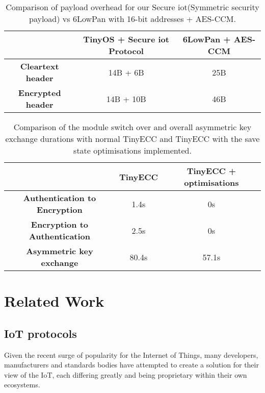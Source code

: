 \documentclass[conference]{./sty/IEEEtran}
\begin{document}
\begin{table}[h] %
  \begin{center} 
  \begin{tabular}{|c|c|c|} 
  \hline
                            & \textbf{TinyOS + Secure iot Protocol} & \textbf{6LowPan + AES-CCM} \\ \hline
  \textbf{Cleartext header} & 14B + 6B                              & 25B                        \\ \hline
  \textbf{Encrypted header} & 14B + 10B                             & 46B                        \\ \hline
  \end{tabular}
  \caption[Table]{Comparison of payload overhead for our Secure iot(Symmetric security payload) vs 6LowPan with 16-bit addresses + AES-CCM.}
  \label{tab:pdu_sizes}
  \end{center}
\end{table}
\vspace{-0.5cm}
\begin{table}[h] %
  \begin{center} 
  \begin{tabular}{|c|c|c|} 
  \hline
                                        & \textbf{TinyECC} & \textbf{TinyECC + optimisations} \\ \hline
  \textbf{Authentication to Encryption} & 1.4s             & 0s                      \\ \hline
  \textbf{Encryption to Authentication} & 2.5s             & 0s                      \\ \hline
  \textbf{Asymmetric key exchange}      & 80.4s            & 57.1s                     \\ \hline
  \end{tabular}
  \caption[Table]{Comparison of the module switch over and overall asymmetric key exchange durations with normal TinyECC and TinyECC with the save state optimisations implemented.}
  \label{tab:ECC_optimisations}
  \end{center}
\end{table}
\vspace{-0.5cm}

\section{Related Work} %
\label{sec:related_work}
\subsection{IoT protocols} %
\label{sub:iot_protocols}
Given the recent surge of popularity for the Internet of Things, many developers, manufacturers and standards bodies have attempted to create a solution for their view of the IoT, each differing greatly and being proprietary within their own ecosystems. 
\end{document}
